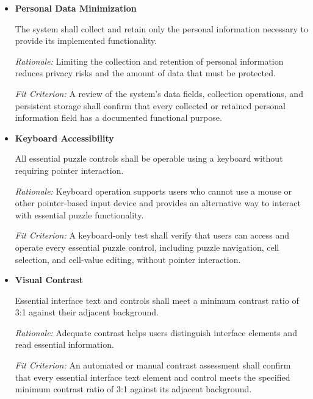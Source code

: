 \documentclass[12pt]{article}
\newcounter{nfrnum} %
\begin{document}
\begin{itemize}
\item[NFR\refstepcounter{nfrnum}\thenfrnum
\label{NFR_17}:]
\textbf{Personal Data Minimization}

The system shall collect and retain only the personal
information necessary to provide its implemented functionality.

\textit{Rationale:} Limiting the collection and retention of
personal information reduces privacy risks and the amount
of data that must be protected.

\textit{Fit Criterion:} A review of the system's data fields,
collection operations, and persistent storage shall confirm
that every collected or retained personal information field
has a documented functional purpose.



\item[NFR\refstepcounter{nfrnum}\thenfrnum
\label{NFR_18}:]
\textbf{Keyboard Accessibility}

All essential puzzle controls shall be operable using a
keyboard without requiring pointer interaction.

\textit{Rationale:} Keyboard operation supports users who
cannot use a mouse or other pointer-based input device and
provides an alternative way to interact with essential
puzzle functionality.

\textit{Fit Criterion:} A keyboard-only test shall verify
that users can access and operate every essential puzzle
control, including puzzle navigation, cell selection, and
cell-value editing, without pointer interaction.


\item[NFR\refstepcounter{nfrnum}\thenfrnum
\label{NFR_19}:]
\textbf{Visual Contrast}

Essential interface text and controls shall meet a minimum
contrast ratio of 3:1 against their adjacent background.

\textit{Rationale:} Adequate contrast helps users distinguish
interface elements and read essential information.

\textit{Fit Criterion:} An automated or manual contrast
assessment shall confirm that every essential interface
text element and control meets the specified minimum
contrast ratio of 3:1 against its adjacent background.


\end{itemize}
\end{document}
